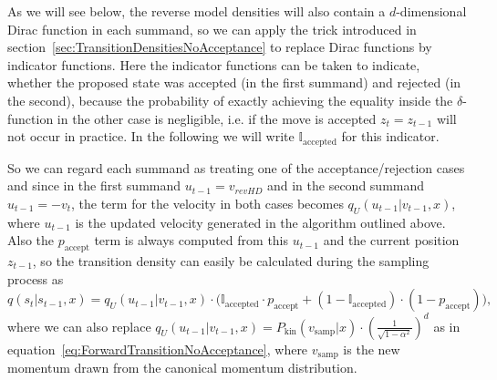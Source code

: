 \documentclass[12pt]{scrartcl}
\begin{document}
As we will see below, the reverse model densities will also contain a $d$-dimensional Dirac function in each summand, so we can apply the trick introduced in section~\ref{sec:TransitionDensitiesNoAcceptance} to replace Dirac functions by indicator functions. Here the indicator functions can be taken to indicate, whether the proposed state was accepted (in the first summand) and rejected (in the second), because the probability of exactly achieving the equality inside the $\delta$-function in the other case is negligible, i.e. if the move is accepted $z_t = z_{t-1}$ will not occur in practice. In the following we will write $\mathbb{I}_\textrm{accepted}$ for this indicator.

So we can regard each summand as treating one of the acceptance/rejection cases and since in the first summand $u_{t-1} = v_{revHD}$ and in the second summand $u_{t-1} = -v_t$, the term for the velocity in both cases becomes $q_U(u_{t-1}|v_{t-1}, x)$, where $u_{t-1}$ is the updated velocity generated in the algorithm outlined above. Also the $p_\textrm{accept}$ term is always computed from this $u_{t-1}$ and the current position $z_{t-1}$, so the transition density can easily be calculated during the sampling process as
\begin{equation}
q(s_t|s_{t-1}, x) = q_U(u_{t-1}|v_{t-1}, x) \cdot \Big( \mathbb{I}_\textrm{accepted} \cdot p_{\textrm{accept}} + (1 - \mathbb{I}_\textrm{accepted}) \cdot (1- p_{\textrm{accept}}) \Big),
\end{equation}
where we can also replace $q_U(u_{t-1}|v_{t-1}, x) = P_\textrm{kin}(v_{\textrm{samp}}|x) \cdot (\frac{1}{\sqrt{1 - \alpha^2}})^{d}$ as in equation~\eqref{eq:ForwardTransitionNoAcceptance}, where $v_{\textrm{samp}}$ is the new momentum drawn from the canonical momentum distribution.
\end{document}
